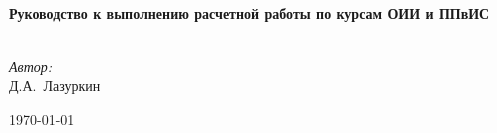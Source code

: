 
\begin{titlepage}

  \begin{center}

    \vspace{6cm}

    \HRule \\[0.4cm]
    { \huge \bfseries Руководство к выполнению расчетной работы по курсам ОИИ и ППвИС}\\[0.4cm]

    \HRule \\[1.5cm]

    \begin{minipage}{0.4\textwidth}
      \begin{flushright} \large
        \emph{Автор:} \\
        Д.А.~Лазуркин
      \end{flushright}
    \end{minipage}

    \vfill

    {\large \today}

  \end{center}

\end{titlepage}

